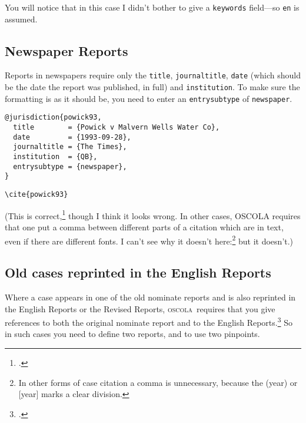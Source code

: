 \documentclass[a4paper,
               11pt,
	       DIV=1,			   
	       footinclude=false]
	      {scrartcl}
\newcommand{\oscolashort}{\textsc{oscola}\nocite{oscola}}
\newcounter{egcounter}\setcounter{egcounter}{0}
\newlength{\boxwidth}
\newenvironment{bibexample}[1][]
{%
  \medskip\par\noindent\ignorespaces
  \marginpar{[\refstepcounter{egcounter}\arabic{egcounter}]\label{#1}}%
  \setlength{\boxwidth}{0.95\linewidth}%
  \addtolength{\boxwidth}{-2\fboxsep}
  \addtolength{\boxwidth}{-2\fboxrule}
  \begin{lrbox}{\boxcontainer}
  \begin{minipage}[t]{\boxwidth}%
}
{%
  \end{minipage}\end{lrbox}%
  \colorbox{gray!30}{\usebox{\boxcontainer}}
  \par\medskip}
\newcommand{\egcite}[1]{{\texttt{\textbackslash cite#1}}}
\begin{document}
You will notice that in this case I didn't bother to give a
\texttt{keywords} field---so \texttt{en} is assumed.

\subsection{Newspaper Reports}

Reports in newspapers require only the \texttt{title},
\texttt{journaltitle}, \texttt{date} (which should be the date the
report was published, in full) and \texttt{institution}. To make sure
the formatting is as it should be, you need to enter an \texttt{entrysubtype} of \texttt{newspaper}.

\begin{bibexample}[powick93]
\begin{verbatim}
@jurisdiction{powick93,
  title        = {Powick v Malvern Wells Water Co},
  date         = {1993-09-28},
  journaltitle = {The Times},
  institution  = {QB},
  entrysubtype = {newspaper},
}
\end{verbatim}
\end{bibexample}

\begin{description}
\item[\egcite{\{powick93\}}] \cite{powick93}
\end{description}
\noindent
(This is correct,\footcite[See][18]{oscola} though I
think it looks wrong. In other cases, OSCOLA requires that one put a
comma between different parts of a citation which are in text, even if
there are different fonts. I can't see why it doesn't
here:\footnote{In other forms of case citation a comma is unnecessary,
  because the (year) or [year] marks a clear division.} but it
doesn't.)

\subsection{Old cases reprinted in the English Reports\label{parallel:reports}}


Where a case appears in one of the old nominate reports and is also
reprinted in the English Reports or the Revised Reports, \oscolashort\
requires that you give references to both the original nominate report
and to the English Reports.\footcite[20--21]{oscola} So in such cases
you need to define two reports, and to use two pinpoints.
\end{document}
